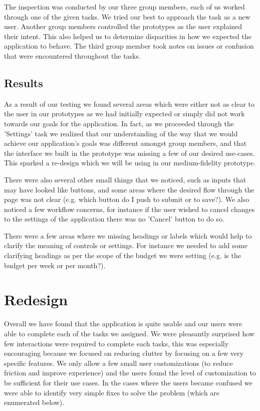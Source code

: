 \documentclass{chi2011}
\begin{document}
    The inspection was conducted by our three group members, each of us worked through one of the given tasks. We
    tried our best to approach the task as a new user. Another group members controlled the prototypes as the user
    explained their intent. This also helped us to determine disparities in how we expected the application to behave.
    The third group member took notes on issues or confusion that were encountered throughout the tasks.

    \subsection{Results} 
    
    As a result of our testing we found several areas which were either not
    as clear to the user in our prototypes as we had initially expected or
    simply did not work towards our goals for the application. In fact, as we
    proceeded through the 'Settings' task we realized that our understanding of
    the way that we would achieve our application's goals was different amongst
    group members, and that the interface we built in the prototype was missing
    a few of our desired use-cases. This sparked a re-design which we will be
    using in our medium-fidelity prototype.

    There were also several other small things that we noticed, such as inputs
    that may have looked like buttons, and some areas where the desired flow
    through the page was not clear (e.g. which button do I push to submit or to
    save?). We also noticed a few workflow concerns, for instance if the user
    wished to cancel changes to the settings of the application there was no
    'Cancel' button to do so.

    There were a few areas where we missing headings or labels which would help
    to clarify the meaning of controls or settings. For instance we needed to
    add some clarifying headings as per the scope of the budget we were setting
    (e.g. is the budget per week or per month?).


\section{Redesign}

Overall we have found that the application is quite usable and our users were able to complete each of the tasks we
assigned. We were pleasantly surprised how few interactions were required to complete each tasks, this was especially
encouraging because we focused on reducing clutter by focusing on a few very specific features. We only allow a few
small user customizations (to reduce friction and improve experience) and the users found the level of
customization to be sufficient for their use cases. In the cases where the users became confused we were able to
identify very simple fixes to solve the problem (which are enumerated below).
\end{document}
